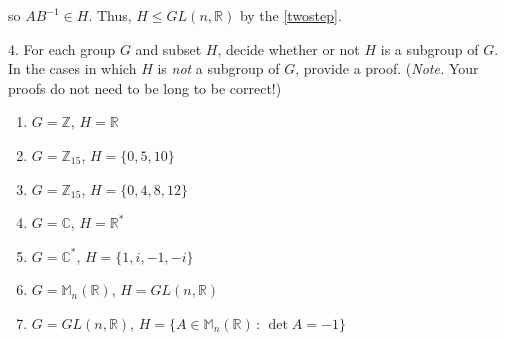 \documentclass[10pt,]{book}
\theoremstyle{plain}
\theoremstyle{definition}
\theoremstyle{definition}
\theoremstyle{definition}
\theoremstyle{definition}
\numberwithin{equation}{section}
\def\Z{\mathbb{Z}}
\def\R{\mathbb{R}}
\def\C{\mathbb{C}}
\def\M{\mathbb{M}}
\begin{document}
\begin{exerciselist}
\begin{enumerate}[label=(\alph*)]
\begin{equation*}
\end{equation*}

          so \(AB^{-1}\in H\).  Thus, \(H\leq GL(n,\R)\) by the \hyperref[twostep]{\ref{twostep}}.
\end{enumerate}
\item[4.]\hypertarget{exercise-31}{}
        For each group \(G\) and subset \(H\), decide whether or not \(H\) is a subgroup of \(G\). In the cases in which \(H\) is \emph{not} a subgroup of \(G\), provide a proof. (\emph{Note.} Your proofs do not need to be long to be correct!)
        \leavevmode%
\begin{enumerate}[label=(\alph*)]
\item\hypertarget{li-229}{}
              \(G=\Z\), \(H=\R\)
\item\hypertarget{li-230}{}
              \(G=\Z_{15}\), \(H=\{0,5,10\}\)
\item\hypertarget{li-231}{}
              \(G=\Z_{15}\), \(H=\{0,4,8,12\}\)
\item\hypertarget{li-232}{}
              \(G=\C\), \(H=\R^*\)
\item\hypertarget{li-233}{}
              \(G=\C^*\), \(H=\{1,i,-1,-i\}\)
\item\hypertarget{li-234}{}
              \(G=\M_n(\R)\), \(H=GL(n,\R)\)
\item\hypertarget{li-235}{}
              \(G=GL(n,\R)\), \(H=\{A\in \M_n(\R)\,:\,\det A = -1\}\)
\end{enumerate}


\end{exerciselist}
\end{document}
